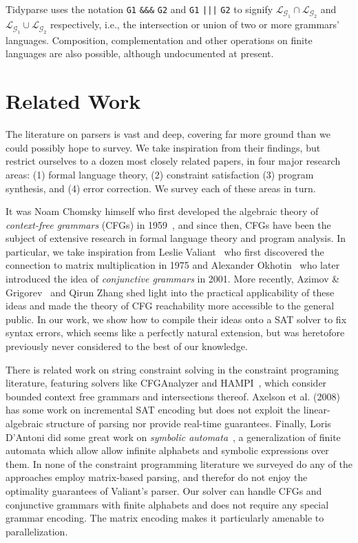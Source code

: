 \documentclass[sigplan,review,anonymous,acmsmall]{acmart}\settopmatter{printfolios=false,printccs=false,printacmref=false}
\begin{document}
\noindent Tidyparse uses the notation \texttt{G1} {\color{blue}\texttt{\&\&\&}} \texttt{G2} and \texttt{G1} {\color{blue}\texttt{|||}} \texttt{G2} to signify $\mathcal{L}_{\mathcal{G}_1}\cap\mathcal{L}_{\mathcal{G}_2}$ and $\mathcal{L}_{\mathcal{G}_1}\cup\mathcal{L}_{\mathcal{G}_2}$ respectively, i.e., the intersection or union of two or more grammars' languages. {Composition}, complementation and other operations on finite languages are also possible, although undocumented at present.

%

\section{Related Work}

The literature on parsers is vast and deep, covering far more ground than we could possibly hope to survey. We take inspiration from their findings, but restrict ourselves to a dozen most closely related papers, in four major research areas: (1) formal language theory, (2) constraint satisfaction (3) program synthesis, and (4) error correction. We survey each of these areas in turn.

It was Noam Chomsky himself who first developed the algebraic theory of \textit{context-free grammars} (CFGs) in 1959~\cite{chomsky1959algebraic}, and since then, CFGs have been the subject of extensive research in formal language theory and program analysis. In particular, we take inspiration from Leslie Valiant~\cite{valiant1975general} who first discovered the connection to matrix multiplication in 1975 and Alexander Okhotin~\cite{okhotin2001conjunctive} who later introduced the idea of \textit{conjunctive grammars} in 2001. More recently, Azimov \& Grigorev~\cite{azimov2018cfpq} and Qirun Zhang shed light into the practical applicability of these ideas and made the theory of CFG reachability more accessible to the general public. In our work, we show how to compile their ideas onto a SAT solver to fix syntax errors, which seems like a perfectly natural extension, but was heretofore previously never considered to the best of our knowledge.

There is related work on string constraint solving in the constraint programing literature, featuring solvers like CFGAnalyzer and HAMPI~\cite{kiezun2009hampi}, which consider bounded context free grammars and intersections thereof. Axelson et al. (2008)~\cite{axelsson2008analyzing} has some work on incremental SAT encoding but does not exploit the linear-algebraic structure of parsing nor provide real-time guarantees. Finally, Loris D'Antoni did some great work on \textit{symbolic automata}~\cite{dantoni2014minimization}, a generalization of finite automata which allow allow infinite alphabets and symbolic expressions over them. In none of the constraint programming literature we surveyed do any of the approaches employ matrix-based parsing, and therefor do not enjoy the optimality guarantees of Valiant's parser. Our solver can handle CFGs and conjunctive grammars with finite alphabets and does not require any special grammar encoding. The matrix encoding makes it particularly amenable to parallelization.
\end{document}
